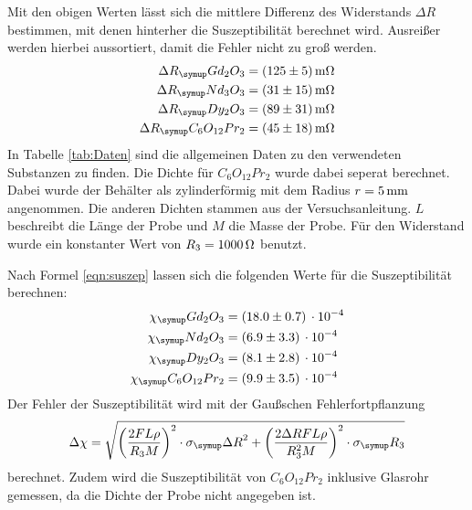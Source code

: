 \noindent
Mit den obigen Werten lässt sich die mittlere Differenz des Widerstands
$\Delta R$ bestimmen, mit denen hinterher die Suszeptibilität berechnet wird.
Ausreißer werden hierbei aussortiert, damit die Fehler nicht zu groß werden.
\begin{align*}
  \Delta R_\su{Gd_2O_3}    &= (125\pm5) \mOhm \\
  \Delta R_\su{Nd_3O_3}    &= (31\pm15) \mOhm \\
  \Delta R_\su{Dy_2O_3}    &= (89\pm31) \mOhm \\
  \Delta R_\su{C_6O_{12}Pr_2} &= (45\pm18) \mOhm
\end{align*}
In Tabelle \ref{tab:Daten} sind die allgemeinen Daten zu den verwendeten Substanzen
zu finden. Die Dichte für $C_6O_{12}Pr_2$ wurde dabei seperat berechnet. Dabei wurde
der Behälter als zylinderförmig mit dem Radius $r=5\,\si{\milli\meter}$ angenommen. Die anderen Dichten
stammen aus der Versuchsanleitung. $L$ beschreibt die Länge der Probe und $M$ die
Masse der Probe. Für den Widerstand wurde ein konstanter Wert von $R_3=1000\,\si{\ohm}$
benutzt.

Nach Formel \eqref{eqn:suszep} lassen sich die folgenden Werte für die Suszeptibilität
berechnen:
\begin{align*}
  \chi_\su{Gd_2O_3}       &= (18.0 \pm 0.7)\,\cdot10^{-4} \\
  \chi_\su{Nd_2O_3}       &= ( 6.9 \pm 3.3)\,\cdot10^{-4} \\
  \chi_\su{Dy_2O_3}       &= ( 8.1 \pm 2.8)\,\cdot10^{-4} \\ %
  \chi_\su{C_6O_{12}Pr_2} &= ( 9.9 \pm 3.5)\,\cdot10^{-4} \\
\end{align*}
Der Fehler der Suszeptibilität wird mit der Gaußschen Fehlerfortpflanzung
\begin{equation*}
  \Delta\chi = \sqrt{\left(\frac{2FL\rho}{R_3M}\right)^2\cdot\sigma_\su{\Delta R}^2
  + \left(\frac{2\Delta R FL\rho}{R_3^2M}\right)^2\cdot\sigma_\su{R_3}}
\end{equation*}
berechnet. Zudem wird die Suszeptibilität von $C_6O_{12}Pr_2$ inklusive
Glasrohr gemessen, da die Dichte der Probe nicht angegeben ist.

